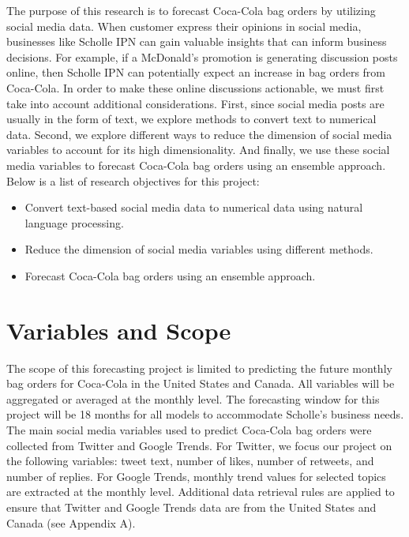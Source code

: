 \documentclass[12pt,oneside]{chicagocapstone}
\providecommand{\tightlist}{%
  \setlength{\itemsep}{0pt}\setlength{\parskip}{0pt}}
\begin{document}
The purpose of this research is to forecast Coca-Cola bag orders by utilizing social media data. When customer express their opinions in social media, businesses like Scholle IPN can gain valuable insights that can inform business decisions. For example, if a McDonald's promotion is generating discussion posts online, then Scholle IPN can potentially expect an increase in bag orders from Coca-Cola. In order to make these online discussions actionable, we must first take into account additional considerations. First, since social media posts are usually in the form of text, we explore methods to convert text to numerical data. Second, we explore different ways to reduce the dimension of social media variables to account for its high dimensionality. And finally, we use these social media variables to forecast Coca-Cola bag orders using an ensemble approach. Below is a list of research objectives for this project:
\begin{itemize}
\tightlist
\item
  Convert text-based social media data to numerical data using natural language processing.
\item
  Reduce the dimension of social media variables using different methods.
\item
  Forecast Coca-Cola bag orders using an ensemble approach.
\end{itemize}
\hypertarget{variables-and-scope}{%
\section*{Variables and Scope}\label{variables-and-scope}}

The scope of this forecasting project is limited to predicting the future monthly bag orders for Coca-Cola in the United States and Canada. All variables will be aggregated or averaged at the monthly level. The forecasting window for this project will be 18 months for all models to accommodate Scholle's business needs. The main social media variables used to predict Coca-Cola bag orders were collected from Twitter and Google Trends. For Twitter, we focus our project on the following variables: tweet text, number of likes, number of retweets, and number of replies. For Google Trends, monthly trend values for selected topics are extracted at the monthly level. Additional data retrieval rules are applied to ensure that Twitter and Google Trends data are from the United States and Canada (see Appendix A).
\end{document}
